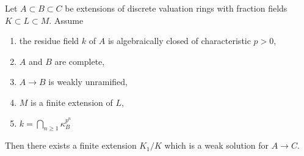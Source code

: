 %
\begin{lemma}
\label{lemma-special-case}
Let $A \subset B \subset C$ be extensions of discrete valuation rings
with fraction fields $K \subset L \subset M$. Assume
\begin{enumerate}
\item the residue field $k$ of $A$ is algebraically closed of
characteristic $p > 0$,
\item $A$ and $B$ are complete,
\item $A \to B$ is weakly unramified,
\item $M$ is a finite extension of $L$,
\item $k = \bigcap\nolimits_{n \geq 1} \kappa_B^{p^n}$
\end{enumerate}
Then there exists a finite extension $K_1/K$ which
is a weak solution for $A \to C$.
\end{lemma}

